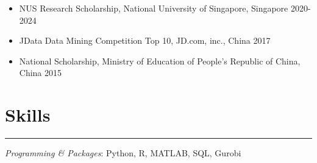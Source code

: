 \documentclass[12pt, a4paper]{article}
\begin{document}
{\begin{itemize}[leftmargin=26pt, itemsep=1pt, parsep=0.5pt, topsep=1pt]
	\item NUS Research Scholarship, National University of Singapore, Singapore \hfill 2020-2024
	
	\item JData Data Mining Competition Top 10, JD.com, inc., China \hfill 2017

	\item National Scholarship, Ministry of Education of People’s Republic of China, China \hfill 2015


\end{itemize}




\section*{Skills}
\vspace*{0.4em}
\hrule height 0.5pt

\textit{Programming \& Packages}: Python, R, MATLAB, SQL, Gurobi


}

\end{document}
